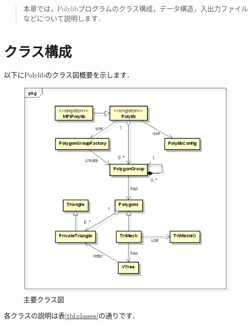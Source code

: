 {\begin{abstract}
本章では，Polylibプログラムのクラス構成，データ構造，入出力ファイルなどについて説明します．
\end{abstract}

% 
\graphicspath{{./fig_prg/}}

%
\section{クラス構成}

以下にPolylibのクラス図概要を示します．

\begin{figure}[H]
 \centering
 \includegraphics[width=12cm]{clip000.eps}
 \caption{主要クラス図}
\end{figure}

各クラスの説明は表\ref{tbl:classes}の通りです．

\pagebreak

}
